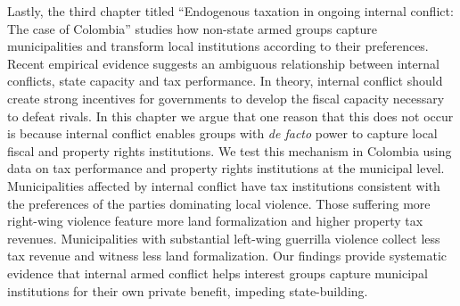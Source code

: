 Lastly, the third chapter titled ``Endogenous taxation in ongoing internal conflict: The case of Colombia'' studies how non-state armed groups capture municipalities and transform local institutions according to their preferences. Recent empirical evidence suggests an ambiguous relationship between internal conflicts, state capacity and tax performance. In theory, internal conflict should create strong incentives for governments to develop the fiscal capacity necessary to defeat rivals. In this chapter we argue that one reason that this does not occur is because internal conflict enables groups with {\it{de facto}} power to capture local fiscal and property rights institutions. We test this mechanism in Colombia using data on tax performance and property rights institutions at the municipal level. Municipalities affected by internal conflict have tax institutions consistent with the preferences of the parties dominating local violence. Those suffering more right-wing violence feature more land formalization and higher property tax revenues. Municipalities with substantial left-wing guerrilla violence collect less tax revenue and witness less land formalization. Our findings provide systematic evidence that internal armed conflict helps interest groups capture municipal institutions for their own private benefit, impeding state-building.

